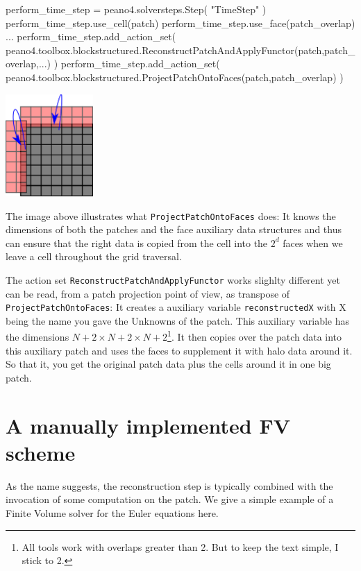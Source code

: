 \begin{code}
perform_time_step      = peano4.solversteps.Step( "TimeStep" )
perform_time_step.use_cell(patch)
perform_time_step.use_face(patch_overlap)
...
perform_time_step.add_action_set( 
  peano4.toolbox.blockstructured.ReconstructPatchAndApplyFunctor(patch,patch_overlap,...)
) 
perform_time_step.add_action_set( 
  peano4.toolbox.blockstructured.ProjectPatchOntoFaces(patch,patch_overlap) 
)
\end{code}



\begin{center}
  \includegraphics[width=0.25\textwidth]{42_finite-volumes/ProjectPatchOntoFaces.pdf}
\end{center}


\noindent
The image above illustrates what \texttt{ProjectPatchOntoFaces} does:
It knows the dimensions of both the patches and the face auxiliary data
structures and thus can ensure that the right data is copied from the cell into
the $2^d$ faces when we leave a cell throughout the grid traversal.



The action set \texttt{ReconstructPatchAndApplyFunctor} works slighlty different
yet can be read, from a patch projection point of view, as transpose of
\texttt{ProjectPatchOntoFaces}:
It creates a auxiliary variable \texttt{reconstructedX} with X being the name
you gave the Unknowns of the patch.
This auxiliary variable has the dimensions 
$N+2 \times N+2 \times N+2$\footnote{All tools work with overlaps greater than
2. But to keep the text simple, I stick to 2.}.
It then copies over the patch data into this auxiliary patch and uses the faces
to supplement it with halo data around it.
So that it, you get the original patch data plus the cells around it in one big
patch.


\section{A manually implemented FV scheme}

As the name suggests, the reconstruction step is typically combined with the
invocation of some computation on the patch.
We give a simple example of a Finite Volume solver for the Euler equations here.


